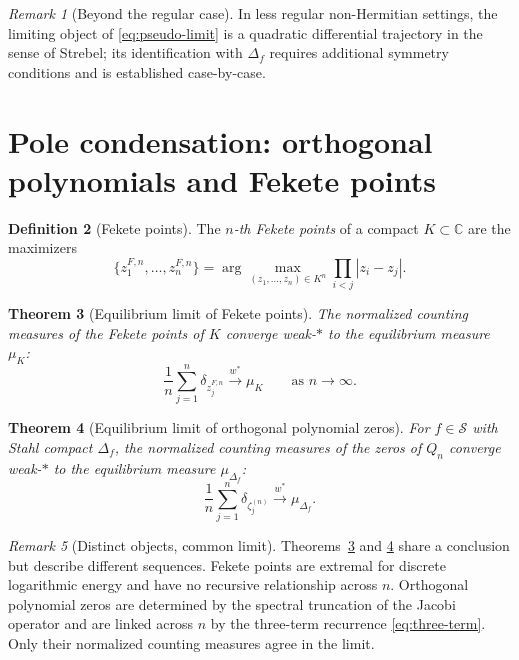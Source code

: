 \documentclass[11pt]{article}
\newtheorem{theorem}{Theorem}[section]
\theoremstyle{definition}
\newtheorem{definition}[theorem]{Definition}
\theoremstyle{remark}
\newtheorem{remark}[theorem]{Remark}
\begin{document}
\begin{remark}[Beyond the regular case]
\label{rem:non-regular}
In less regular non-Hermitian settings, the limiting object of \eqref{eq:pseudo-limit} is a quadratic differential trajectory in the sense of Strebel; its identification with $\Delta_{f}$ requires additional symmetry conditions and is established case-by-case.
\end{remark}

\section{Pole condensation: orthogonal polynomials and Fekete points}
\label{sec:poles}

\begin{definition}[Fekete points]
\label{def:fekete}
The \emph{$n$-th Fekete points} of a compact $K\subset\mathbb{C}$ are the maximizers
\begin{equation}
\{z_{1}^{F,n},\dots,z_{n}^{F,n}\}=\arg\max_{(z_{1},\dots,z_{n})\in K^{n}}\prod_{i<j}|z_{i}-z_{j}|.
\label{eq:fekete}
\end{equation}
\end{definition}

\begin{theorem}[Equilibrium limit of Fekete points]
\label{thm:fekete-equilibrium}
The normalized counting measures of the Fekete points of $K$ converge weak-$\ast$ to the equilibrium measure $\mu_{K}$:
\begin{equation}
\frac{1}{n}\sum_{j=1}^{n}\delta_{z_{j}^{F,n}}\xrightarrow{w^{\ast}}\mu_{K}
\qquad\text{as }n\to\infty.
\label{eq:fekete-limit}
\end{equation}
\end{theorem}

\begin{theorem}[Equilibrium limit of orthogonal polynomial zeros]
\label{thm:zeros-equilibrium}
For $f\in\mathcal{S}$ with Stahl compact $\Delta_{f}$, the normalized counting measures of the zeros of $Q_{n}$ converge weak-$\ast$ to the equilibrium measure $\mu_{\Delta_{f}}$:
\begin{equation}
\frac{1}{n}\sum_{j=1}^{n}\delta_{\zeta_{j}^{(n)}}\xrightarrow{w^{\ast}}\mu_{\Delta_{f}}.
\label{eq:zeros-limit}
\end{equation}
\end{theorem}

\begin{remark}[Distinct objects, common limit]
\label{rem:distinct-objects}
Theorems~\ref{thm:fekete-equilibrium} and \ref{thm:zeros-equilibrium} share a conclusion but describe different sequences. Fekete points are extremal for discrete logarithmic energy and have no recursive relationship across $n$. Orthogonal polynomial zeros are determined by the spectral truncation of the Jacobi operator and are linked across $n$ by the three-term recurrence \eqref{eq:three-term}. Only their normalized counting measures agree in the limit.
\end{remark}
\end{document}
